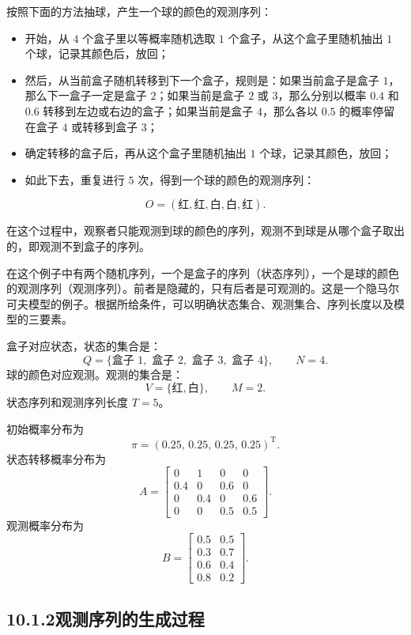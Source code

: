 \documentclass[UTF8,12pt,a4paper,fontset=fandol]{ctexart}
\begin{document}
按照下面的方法抽球，产生一个球的颜色的观测序列：

\begin{itemize}
  \item 开始，从 $4$ 个盒子里以等概率随机选取 $1$ 个盒子，从这个盒子里随机抽出 $1$ 个球，记录其颜色后，放回；
  \item 然后，从当前盒子随机转移到下一个盒子，规则是：如果当前盒子是盒子 $1$，那么下一盒子一定是盒子 $2$；如果当前是盒子 $2$ 或 $3$，那么分别以概率 $0.4$ 和 $0.6$ 转移到左边或右边的盒子；如果当前是盒子 $4$，那么各以 $0.5$ 的概率停留在盒子 $4$ 或转移到盒子 $3$；
  \item 确定转移的盒子后，再从这个盒子里随机抽出 $1$ 个球，记录其颜色，放回；
  \item 如此下去，重复进行 $5$ 次，得到一个球的颜色的观测序列：
\end{itemize}
\[
  O=(\text{红},\text{红},\text{白},\text{白},\text{红}).
\]

在这个过程中，观察者只能观测到球的颜色的序列，观测不到球是从哪个盒子取出的，即观测不到盒子的序列。

在这个例子中有两个随机序列，一个是盒子的序列（状态序列），一个是球的颜色的观测序列（观测序列）。前者是隐藏的，只有后者是可观测的。这是一个隐马尔可夫模型的例子。根据所给条件，可以明确状态集合、观测集合、序列长度以及模型的三要素。

盒子对应状态，状态的集合是：
\[
  Q=\{\text{盒子 }1,\text{ 盒子 }2,\text{ 盒子 }3,\text{ 盒子 }4\},\qquad N=4.
\]
球的颜色对应观测。观测的集合是：
\[
  V=\{\text{红},\text{白}\},\qquad M=2.
\]
状态序列和观测序列长度 $T=5$。

初始概率分布为
\[
  \pi=(0.25,\,0.25,\,0.25,\,0.25)^{\mathrm T}.
\]
状态转移概率分布为
\[
  A=
  \begin{bmatrix}
    0 & 1 & 0 & 0\\
    0.4 & 0 & 0.6 & 0\\
    0 & 0.4 & 0 & 0.6\\
    0 & 0 & 0.5 & 0.5
  \end{bmatrix}.
\]
观测概率分布为
\[
  B=
  \begin{bmatrix}
    0.5 & 0.5\\
    0.3 & 0.7\\
    0.6 & 0.4\\
    0.8 & 0.2
  \end{bmatrix}.
\]

\subsection*{10.1.2\quad 观测序列的生成过程}
\end{document}
